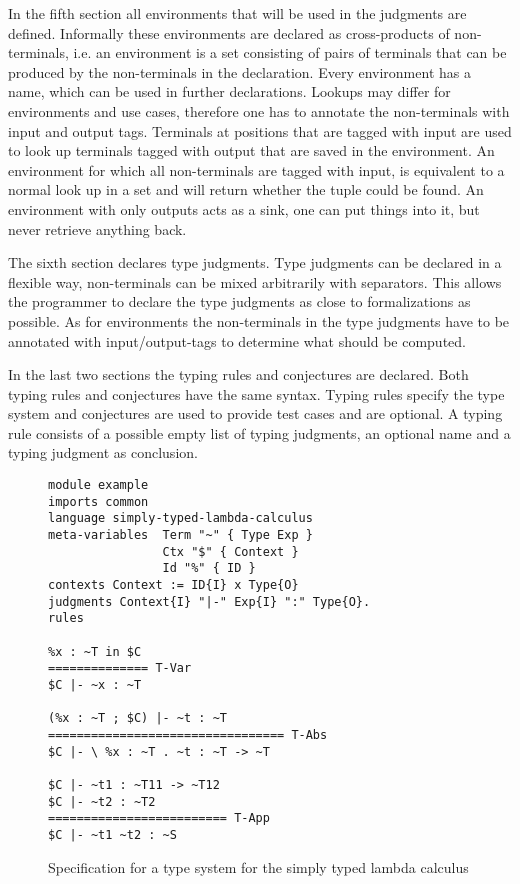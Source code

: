 In the fifth section all environments that will be used in the
judgments are defined. Informally these environments are declared as
cross-products of non-terminals, i.e. an environment is a set
consisting of pairs of terminals that can be produced by the
non-terminals in the declaration. Every environment has a name, which
can be used in further declarations. Lookups may differ for
environments and use cases, therefore one has to annotate the
non-terminals with input and output tags. Terminals at positions that
are tagged with input are used to look up terminals tagged with output
that are saved in the environment. An environment for which all
non-terminals are tagged with input, is equivalent to a normal look up
in a set and will return whether the tuple could be found. An
environment with only outputs acts as a sink, one can put things into
it, but never retrieve anything back.

The sixth section declares type judgments. Type judgments can be
declared in a flexible way, non-terminals can be mixed arbitrarily
with separators. This allows the programmer to declare the type judgments as close to formalizations as
possible. As for environments the non-terminals in the type judgments
have to be annotated with input/output-tags to determine what should
be computed.

In the last two sections the typing rules and conjectures are
declared. Both typing rules and conjectures have the same
syntax. Typing rules specify the type system and conjectures are used
to provide test cases and are optional. A typing rule consists of a
possible empty list of typing judgments, an optional name and a typing
judgment as conclusion.

\begin{figure}
\begin{verbatim}
module example
imports common
language simply-typed-lambda-calculus
meta-variables 	Term "~" { Type Exp }
                Ctx "$" { Context }
                Id "%" { ID }
contexts Context := ID{I} x Type{O}
judgments Context{I} "|-" Exp{I} ":" Type{O}.
rules

%x : ~T in $C
============== T-Var
$C |- ~x : ~T

(%x : ~T ; $C) |- ~t : ~T
================================= T-Abs
$C |- \ %x : ~T . ~t : ~T -> ~T

$C |- ~t1 : ~T11 -> ~T12
$C |- ~t2 : ~T2
========================= T-App
$C |- ~t1 ~t2 : ~S
\end{verbatim}
\caption{Specification for a type system for the simply typed lambda calculus}
\end{figure}

